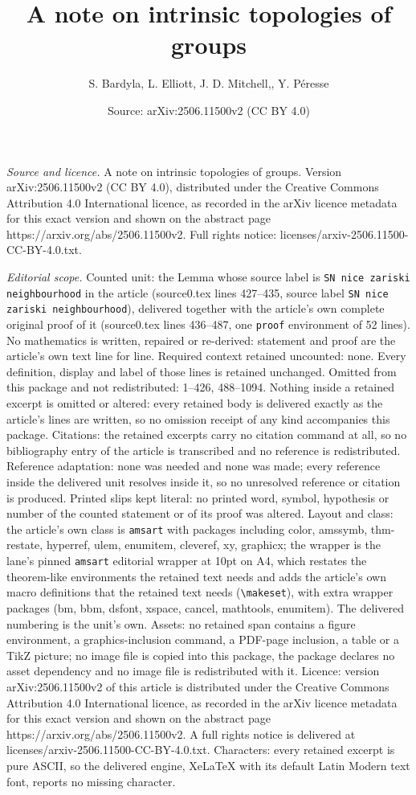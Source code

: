 \documentclass[10pt,a4paper]{amsart}
\title[A note on intrinsic topologies of groups]{A note on intrinsic topologies of groups}
\author{S. Bardyla, L. Elliott, J. D. Mitchell,, Y. P\'eresse}
\date{Source: arXiv:2506.11500v2 (CC BY 4.0)}
\begin{document}
\maketitle

\noindent\emph{Source and licence.} A note on intrinsic topologies of groups. Version arXiv:2506.11500v2 (CC BY 4.0), distributed under the Creative Commons Attribution 4.0 International licence, as recorded in the arXiv licence metadata for this exact version and shown on the abstract page https://arxiv.org/abs/2506.11500v2. Full rights notice: licenses/arxiv-2506.11500-CC-BY-4.0.txt.\par\smallskip

\noindent\textit{Editorial scope.} Counted unit: the Lemma whose source label is \texttt{SN nice zariski neighbourhood} in the article (source0.tex lines 427--435, source label \texttt{SN nice zariski neighbourhood}), delivered together with the article's own complete original proof of it (source0.tex lines 436--487, one \texttt{proof} environment of 52 lines). No mathematics is written, repaired or re-derived: statement and proof are the article's own text line for line. Required context retained uncounted: none. Every definition, display and label of those lines is retained unchanged. Omitted from this package and not redistributed: 1--426, 488--1094. Nothing inside a retained excerpt is omitted or altered: every retained body is delivered exactly as the article's lines are written, so no omission receipt of any kind accompanies this package. Citations: the retained excerpts carry no citation command at all, so no bibliography entry of the article is transcribed and no reference is redistributed. Reference adaptation: none was needed and none was made; every reference inside the delivered unit resolves inside it, so no unresolved reference or citation is produced. Printed slips kept literal: no printed word, symbol, hypothesis or number of the counted statement or of its proof was altered. Layout and class: the article's own class is \texttt{amsart} with packages including color, amssymb, thm-restate, hyperref, ulem, enumitem, cleveref, xy, graphicx; the wrapper is the lane's pinned \texttt{amsart} editorial wrapper at 10pt on A4, which restates the theorem-like environments the retained text needs and adds the article's own macro definitions that the retained text needs (\texttt{\textbackslash makeset}), with extra wrapper packages (bm, bbm, dsfont, xspace, cancel, mathtools, enumitem). The delivered numbering is the unit's own. Assets: no retained span contains a figure environment, a graphics-inclusion command, a PDF-page inclusion, a table or a TikZ picture; no image file is copied into this package, the package declares no asset dependency and no image file is redistributed with it. Licence: version arXiv:2506.11500v2 of this article is distributed under the Creative Commons Attribution 4.0 International licence, as recorded in the arXiv licence metadata for this exact version and shown on the abstract page https://arxiv.org/abs/2506.11500v2. A full rights notice is delivered at licenses/arxiv-2506.11500-CC-BY-4.0.txt. Characters: every retained excerpt is pure ASCII, so the delivered engine, XeLaTeX with its default Latin Modern text font, reports no missing character.
\end{document}
